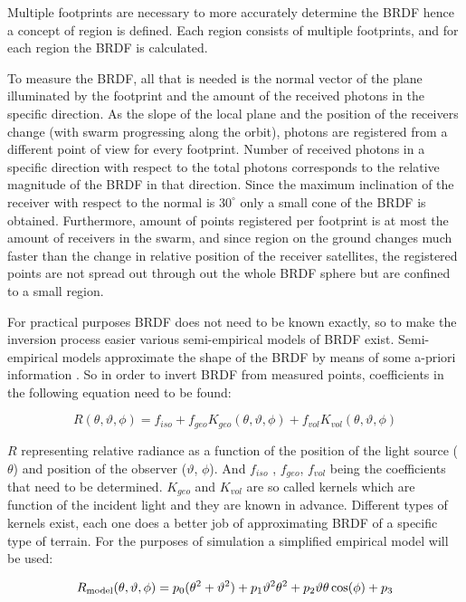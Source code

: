Multiple footprints are necessary to more accurately determine the BRDF hence a concept of region is defined. Each region consists of multiple footprints, and for each region the BRDF is calculated.

To measure the BRDF, all that is needed is the normal vector of the plane illuminated by the footprint and the amount of the received photons in the specific direction. As the slope of the local plane and the position of the receivers change (with swarm progressing along the orbit), photons are registered from a different point of view for every footprint. Number of received photons in a specific direction with respect to the total photons corresponds to the relative magnitude of the BRDF in that direction. Since the maximum inclination of the receiver with respect to the normal is $30^\circ$ only a small cone of the BRDF is obtained. Furthermore, amount of points registered per footprint is at most the amount of receivers in the swarm, and since region on the ground changes much faster than the change in relative position of the receiver satellites, the registered points are not spread out through out the whole BRDF sphere but are confined to a small region. 

For practical purposes BRDF does not need to be known exactly, so to make the inversion process easier various semi-empirical models of BRDF exist. Semi-empirical models approximate the shape of the BRDF by means of some a-priori information \cite{BRDFwanner}. So in order to invert BRDF from measured points, coefficients in the following equation need to be found:

\[
R(\theta ,\vartheta ,\phi ) = f_{iso}  + f_{geo} K_{geo} (\theta ,\vartheta ,\phi ) + f_{vol} K_{vol} (\theta ,\vartheta ,\phi )
\]


$R$ representing relative radiance as a function of the position of the light source ($\theta$) and position of the observer ($\vartheta$, $\phi$).
And $f_{iso}$  , $f_{geo}$, $f_{vol}$  being the coefficients that need to be determined. $K_{geo}$ and $K_{vol}$ are so called kernels which are function of the incident light and they are known in advance. Different types of kernels exist, each one does a better job of approximating BRDF of a specific type of terrain. 
For the purposes of simulation a simplified empirical model will be used:

\[
R_{{\rm{model}}} (\theta ,\vartheta ,\phi ){\rm{ }} = {\rm{ }}p_0 (\theta _{}^2  + \vartheta _{}^2 ) + p_1 \vartheta _{}^2 \theta _{}^2  + p_2 \vartheta \theta \cos (\phi ) + p_3 
\]



